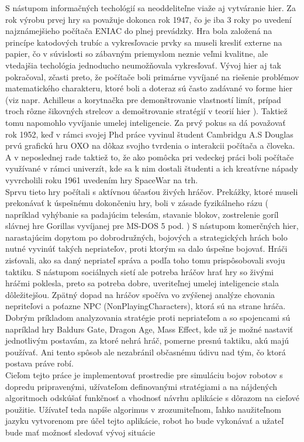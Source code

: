	\indent S nástupom informačných techológií sa neoddeliteľne viaže aj vytváranie hier. Za rok výrobu prvej hry sa považuje dokonca rok 1947, čo je iba 3 roky po uvedení najznámejšieho počítača ENIAC do plnej prevádzky. Hra bola založená na princípe katodových trubíc a vykresľovacie prvky sa museli kresliť externe na papier, čo v súvislosti so zábavným priemyslom neznie veľmi kvalitne, ale vtedajšia techológia jednoducho neumožňovala vykresľovať. Vývoj hier aj tak pokračoval, zčasti preto, že počítače boli primárne vyvíjané na riešenie problémov matematického charakteru, ktoré boli a doteraz sú často zadávané vo forme hier (viz napr. Achilleus a korytnačka pre demonštrovanie vlastností limít, prípad troch rôzne šikovných strelcov a demoštrovanie stratégií v teorií hier ). Taktiež tomu napomohlo vyvíjanie umelej inteligencie. Za prvý pokus sa dá považovať rok 1952, keď v rámci svojej Phd práce vyvinul študent Cambridgu A.S Douglas prvú grafickú hru OXO na dôkaz svojho tvrdenia o interakcii počítača a človeka. A v neposlednej rade taktiež to, že ako pomôcka pri vedeckej práci boli počítače využívané v rámci univerzít, kde sa k nim dostali študenti a ich kreatívne nápady vyvrcholili roku 1961 uvedením hry SpaceWar na trh. \\
\indent Sprvu tieto hry počítali s aktívnou účasťou živých hráčov. Prekážky, ktoré museli prekonávať k úspešnému dokončeniu hry, boli v zásade fyzikálneho rázu ( napríklad vyhýbanie sa padajúcim telesám, stavanie blokov, zostrelenie goríl slávnej hre Gorillas vyvíjanej pre MS-DOS 5 pod. ) S nástupom komerčných hier, narastajúcim dopytom po dobrodružných, bojových a strategických hrách bolo nutné vyvinúť takých nepriateľov, proti ktorým sa dalo úspešne bojovať. Hráči zisťovali, ako sa daný nepriateľ správa a podľa toho tomu prispôsobovali svoju taktiku. S nástupom sociálnych sietí ale potreba hráčov hrať hry so živými hráčmi poklesla, preto sa potreba dobre, uveriteľnej umelej inteligencie stala dôležitejšou. Zpätný dopad na hráčov spočíva vo zvýšenej analýze chovania nepriteľovi a poťazne NPC (NonPlayingCharacters), ktorá sú na strane hráča. Dobrým príkladom analyzovania stratégie proti nepriateľom a so spojencami sú napríklad hry Baldurs Gate, Dragon Age, Mass Effect, kde už je možné nastaviť jednotlivým postavám, za ktoré nehrá hráč, pomerne presnú taktiku, akú majú používať. Ani tento spôsob ale nezabránil občasnému údivu nad tým, čo ktorá postava práve robí. \\
\indent Cieľom tejto práce je implementovať prostredie pre simuláciu bojov robotov s dopredu pripravenými, užívateľom definovanými stratégiami a na nájdených algoritmoch odskúšať funkčnosť a vhodnosť návrhu aplikácie s dôrazom na cieľové použitie. Užívateľ teda napíše algorimus v zrozumiteľnom, ľahko naužiteľnom jazyku vytvorenom pre účel tejto aplikácie, robot ho bude vykonávať a užateľ bude mať možnosť sledovať vývoj situácie\\
